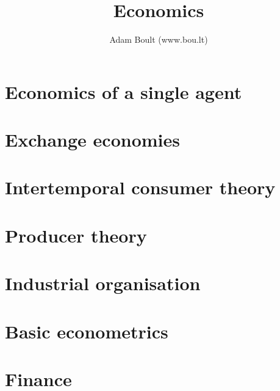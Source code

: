 \documentclass[oneside]{book}
\begin{document}
\author{Adam Boult (www.bou.lt)}
\title{Economics}
\maketitle

\setcounter{tocdepth}{1}
\tableofcontents



\part{Economics of a single agent}


\part{Exchange economies}









\part{Intertemporal consumer theory}




\part{Producer theory}





\part{Industrial organisation}





\part{Basic econometrics}






\part{Finance}







\end{document}
